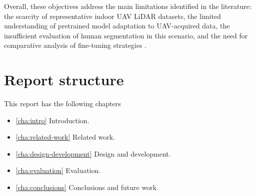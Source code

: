 Overall, these objectives address the main limitations identified in the literature: the scarcity of representative indoor UAV LiDAR datasets, the limited understanding of pretrained model adaptation to UAV-acquired data, the insufficient evaluation of human segmentation in this scenario, and the need for comparative analysis of fine-tuning strategies \cite{Armeni2016S3DIS,Merizette2025ThreeDSES,pan2010survey,Guo2020DeepLearningSurvey}.


\section{Report structure}
This report has the following chapters

\begin{itemize}
\item \autoref{cha:intro} Introduction. 
\item \autoref{cha:related-work} Related work. 
\item \autoref{cha:design-development} Design and development. 
\item \autoref{cha:evaluation} Evaluation.
\item \autoref{cha:conclusions} Conclusions and future work.
\end{itemize}

